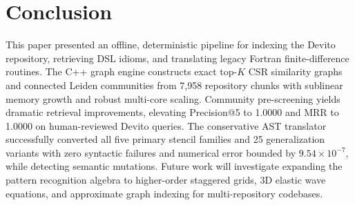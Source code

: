 \documentclass[conference]{IEEEtran}
\begin{document}
\section{Conclusion}
This paper presented an offline, deterministic pipeline for indexing the Devito repository, retrieving DSL idioms, and translating legacy Fortran finite-difference routines. The C++ graph engine constructs exact top-$K$ CSR similarity graphs and connected Leiden communities from 7,958 repository chunks with sublinear memory growth and robust multi-core scaling. Community pre-screening yields dramatic retrieval improvements, elevating Precision@5 to 1.0000 and MRR to 1.0000 on human-reviewed Devito queries. The conservative AST translator successfully converted all five primary stencil families and 25 generalization variants with zero syntactic failures and numerical error bounded by $9.54\times 10^{-7}$, while detecting semantic mutations. Future work will investigate expanding the pattern recognition algebra to higher-order staggered grids, 3D elastic wave equations, and approximate graph indexing for multi-repository codebases.



\end{document}
